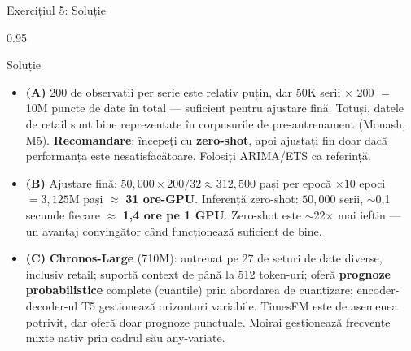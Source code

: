 \documentclass[9pt, aspectratio=169, t]{beamer}
\begin{document}
\begin{frame}{Exercițiul 5: Soluție}
    \begin{cminipage}{0.95\textwidth}
    \begin{exampleblock}{Soluție}
        {\footnotesize
        \begin{itemize}\setlength{\itemsep}{3pt}
            \item \textcolor{MainBlue}{\textbf{(A)}} 200 de observații per serie este relativ puțin, dar 50K serii $\times$ 200 $=$ 10M puncte de date în total --- suficient pentru ajustare fină. Totuși, datele de retail sunt bine reprezentate în corpusurile de pre-antrenament (Monash, M5). \textbf{Recomandare}: începeți cu \textbf{zero-shot}, apoi ajustați fin doar dacă performanța este nesatisfăcătoare. Folosiți ARIMA/ETS ca referință.
            \item \textcolor{MainBlue}{\textbf{(B)}} Ajustare fină: $50{,}000 \times 200 / 32 \approx 312{,}500$ pași per epocă $\times 10$ epoci $= 3{,}125$M pași $\approx$ \textbf{31 ore-GPU}. Inferență zero-shot: $50{,}000$ serii, $\sim$0,1 secunde fiecare $\approx$ \textbf{1,4 ore pe 1 GPU}. Zero-shot este $\sim$22$\times$ mai ieftin --- un avantaj convingător când funcționează suficient de bine.
            \item \textcolor{MainBlue}{\textbf{(C)}} \textbf{Chronos-Large} (710M): antrenat pe 27 de seturi de date diverse, inclusiv retail; suportă context de până la 512 token-uri; oferă \textbf{prognoze probabilistice} complete (cuantile) prin abordarea de cuantizare; encoder-decoder-ul T5 gestionează orizonturi variabile. TimesFM este de asemenea potrivit, dar oferă doar prognoze punctuale. Moirai gestionează frecvențe mixte nativ prin cadrul său any-variate.
        \end{itemize}
        }
    \end{exampleblock}
    \end{cminipage}
\end{frame}
\end{document}
